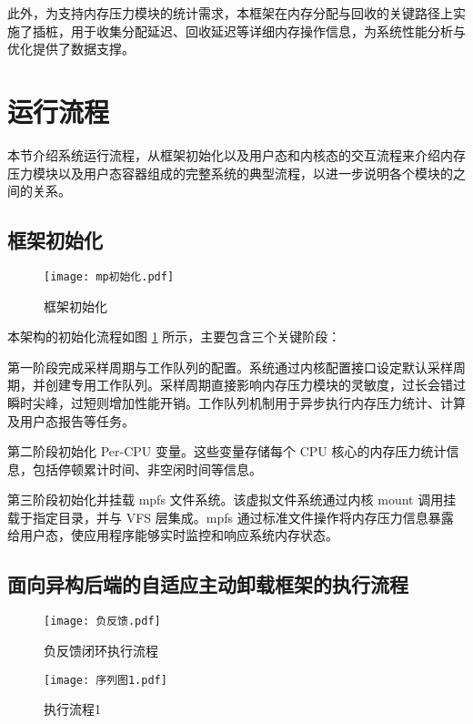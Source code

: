 此外，为支持内存压力模块的统计需求，本框架在内存分配与回收的关键路径上实施了插桩，用于收集分配延迟、回收延迟等详细内存操作信息，为系统性能分析与优化提供了数据支撑。


\section{运行流程}

本节介绍系统运行流程，从框架初始化以及用户态和内核态的交互流程来介绍内存压力模块以及用户态容器组成的完整系统的典型流程，以进一步说明各个模块的之间的关系。

\subsection{框架初始化}

\begin{figure}[h]
    \centering
    \texttt{[image: mp初始化.pdf]}
    \caption{框架初始化}
    \label{fig:framework_initialization}
\end{figure}

本架构的初始化流程如图 \ref{fig:framework_initialization} 所示，主要包含三个关键阶段：

第一阶段完成采样周期与工作队列的配置。系统通过内核配置接口设定默认采样周期，并创建专用工作队列。采样周期直接影响内存压力模块的灵敏度，过长会错过瞬时尖峰，过短则增加性能开销。工作队列机制用于异步执行内存压力统计、计算及用户态报告等任务。

第二阶段初始化 Per-CPU 变量。这些变量存储每个 CPU 核心的内存压力统计信息，包括停顿累计时间、非空闲时间等信息。

第三阶段初始化并挂载 mpfs 文件系统。该虚拟文件系统通过内核 mount 调用挂载于指定目录，并与 VFS 层集成。mpfs 通过标准文件操作将内存压力信息暴露给用户态，使应用程序能够实时监控和响应系统内存状态。

\subsection{面向异构后端的自适应主动卸载框架的执行流程}
\label{sec:面向异构后端的自适应主动卸载框架的执行流程}




\begin{figure}[h]
\centering
\texttt{[image: 负反馈.pdf]}
\caption{负反馈闭环执行流程}
\label{fig:feedback_loop}
\end{figure}

\begin{figure}[h]
\centering
\texttt{[image: 序列图1.pdf]}
\caption{执行流程1}
\label{fig:kernel_sequence_diagram_1}
\end{figure}

